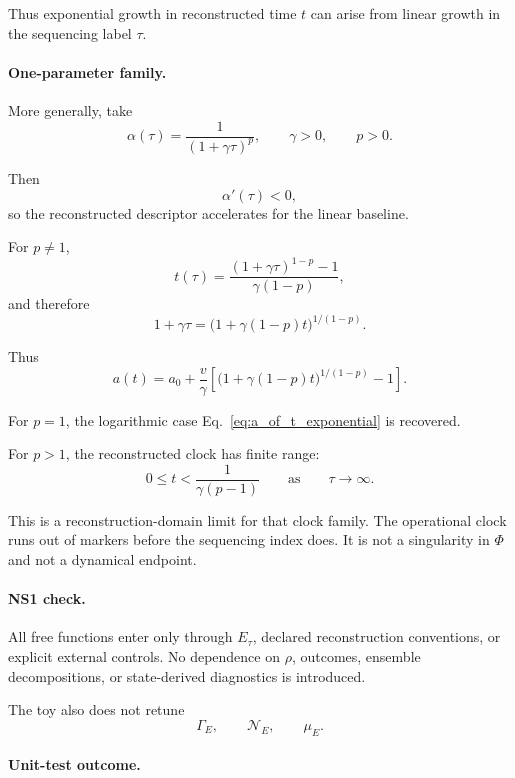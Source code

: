 \documentclass[aps,prx,onecolumn,11pt]{revtex4-2}
\theoremstyle{plain}
\theoremstyle{definition}
\theoremstyle{remark}
\begin{document}
Thus exponential growth in reconstructed time \(t\) can arise from
linear growth in the sequencing label \(\tau\).

\paragraph{One-parameter family.}

More generally, take
\begin{equation}
\alpha(\tau)
=
\frac{1}{(1+\gamma\tau)^p},
\qquad
\gamma>0,
\qquad
p>0.
\label{eq:alpha_family}
\end{equation}

Then
\[
\alpha'(\tau)<0,
\]
so the reconstructed descriptor accelerates for the linear baseline.

For \(p\neq1\),
\[
t(\tau)
=
\frac{
(1+\gamma\tau)^{1-p}-1
}{
\gamma(1-p)
},
\]
and therefore
\[
1+\gamma\tau
=
\bigl(
1+\gamma(1-p)t
\bigr)^{1/(1-p)}.
\]

Thus
\begin{equation}
a(t)
=
a_0
+
\frac{v}{\gamma}
\left[
\bigl(
1+\gamma(1-p)t
\bigr)^{1/(1-p)}
-
1
\right].
\label{eq:a_of_t_family}
\end{equation}

For \(p=1\), the logarithmic case
Eq.~\eqref{eq:a_of_t_exponential} is recovered.

For \(p>1\), the reconstructed clock has finite range:
\[
0
\leq
t
<
\frac{1}{\gamma(p-1)}
\qquad
\text{as}
\qquad
\tau\to\infty.
\]

This is a reconstruction-domain limit for that clock family. The
operational clock runs out of markers before the sequencing index does.
It is not a singularity in \(\Phi\) and not a dynamical endpoint.

\paragraph{NS1 check.}

All free functions enter only through \(E_\tau\), declared
reconstruction conventions, or explicit external controls. No dependence
on \(\rho\), outcomes, ensemble decompositions, or state-derived
diagnostics is introduced.

The toy also does not retune
\[
\Gamma_E,
\qquad
\mathcal N_E,
\qquad
\mu_E.
\]

\paragraph{Unit-test outcome.}
\end{document}
